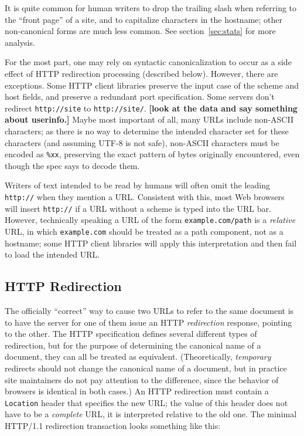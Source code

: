 \documentclass[oneside]{zarticle}
\def\todo#1{{\color{todocolor}\bfseries [#1]}}
\begin{document}
It is quite common for human writers to drop the trailing slash when
referring to the “front page” of a site, and to capitalize characters
in the hostname; other non-canonical forms are much less common.  See
section~\ref{sec:stats} for more analysis.

For the most part, one may rely on syntactic canonicalization to occur
as a side effect of HTTP redirection processing (described below).
However, there are exceptions.  Some HTTP client libraries preserve
the input case of the scheme and host fields, and preserve a redundant
port specification.  Some servers don't redirect \verb|http://site| to
\verb|http://site/|.  \todo{look at the data and say something about
  userinfo.}  Maybe most important of all, many URLs include non-ASCII
characters; as there is no way to determine the intended character set
for these characters (and assuming UTF-8 is not safe), non-ASCII
characters must be encoded as \verb|%xx|, preserving the exact pattern
of bytes originally encountered, even though the spec says to decode them.

Writers of text intended to be read by humans will often omit
the leading \verb|http://| when they mention a URL.  Consistent with
this, most Web browsers will insert \verb|http://| if a URL without a
scheme is typed into the URL bar.  However, technically speaking a URL
of the form \verb|example.com/path| is a \emph{relative} URL, in which
\verb|example.com| should be treated as a path component, not as a
hostname; some HTTP client libraries will apply this interpretation
and then fail to load the intended URL.

\subsection{HTTP Redirection}

The officially “correct” way to cause two URLs to refer to the same
document is to have the server for one of them issue an HTTP
\emph{redirection} response, pointing to the other.  The HTTP
specification defines several different types of redirection, but for
the purpose of determining the canonical name of a document, they can
all be treated as equivalent.  (Theoretically, \emph{temporary}
redirects should not change the canonical name of a document, but in
practice site maintainers do not pay attention to the difference,
since the behavior of browsers is identical in both cases.)  An HTTP
redirection must contain a \verb|Location| header that specifies the
new URL; the value of this header does not have to be a
\emph{complete} URL, it is interpreted relative to the old one.  The
minimal HTTP/1.1 redirection transaction looks something like this:
\end{document}
